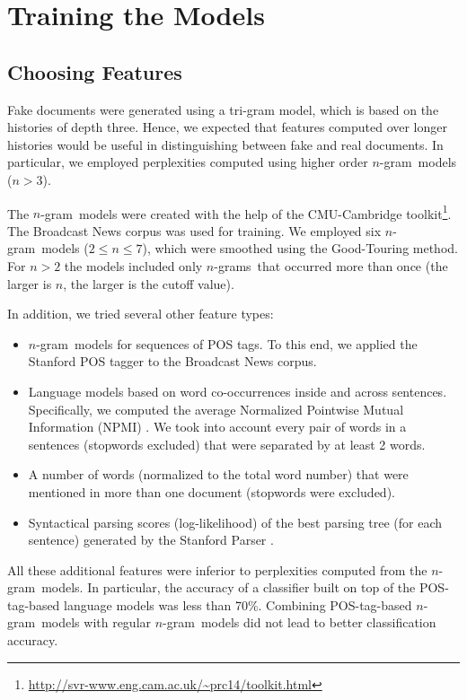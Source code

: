 \documentclass[11pt]{article}
\newcommand{\ngram}{\mbox{$n$-gram }}
\newcommand{\ngrams}{\mbox{$n$-grams }}
\begin{document}
\section{Training the Models}
\subsection{Choosing Features} 
Fake documents were generated using a tri-gram model, 
which is based on the histories of depth three.
Hence, we expected that features computed over longer histories would be useful in distinguishing 
between fake and real documents.
In particular, we employed 
perplexities computed using higher order \ngram models ($n>3$).

The \ngram models were created with the help of the CMU-Cambridge toolkit\footnote{\url{http://svr-www.eng.cam.ac.uk/~prc14/toolkit.html}}.  The Broadcast News corpus was used for training.
We employed six \ngram models ($2 \le n \le 7$), which were smoothed using the Good-Touring method.
For $n>2$ the models included only \ngrams that occurred more than once (the larger is $n$, the larger is the cutoff value).

In addition, we tried several other feature types:
\begin{itemize}
\item \ngram models for sequences of POS tags. To this end, we applied the Stanford POS tagger
to the Broadcast News corpus.
\item Language models based on word co-occurrences inside and across sentences.  
Specifically, we computed the average Normalized Pointwise Mutual Information (NPMI) \cite{Manning:1999}.
We took into account every pair of words in a sentences (stopwords excluded) 
that were separated by at least 2 words.
\item A number of words (normalized to the total word number) that were mentioned in more than one document (stopwords were excluded).
\item Syntactical parsing scores (log-likelihood) of the best parsing tree (for each sentence) generated by the Stanford Parser \cite{Klein03}. 
\end{itemize}
All these additional features were inferior to perplexities computed from the \ngram models.
In particular, the accuracy of a classifier built on top of the POS-tag-based language models
was less than 70\%. Combining POS-tag-based \ngram models with regular \ngram models did not lead
to better classification accuracy.
\end{document}
